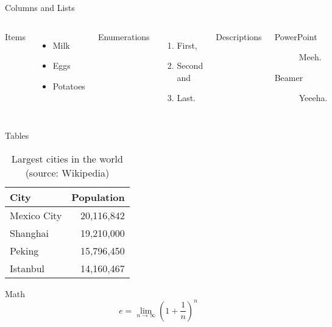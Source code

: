 \begin{frame}{Columns and Lists}
  \begin{columns}[T,onlytextwidth]
      Items
      \begin{itemize}
        \item Milk \item Eggs \item Potatoes
      \end{itemize}

      Enumerations
      \begin{enumerate}
        \item First, \item Second and \item Last.
      \end{enumerate}

      Descriptions
      \begin{description}
        \item[PowerPoint] Meeh. \item[Beamer] Yeeeha.
      \end{description}
  \end{columns}
\end{frame}

\begin{frame}{Tables}
  \begin{table}
    \caption{Largest cities in the world (source: Wikipedia)}
    \begin{tabular}{@{} lr @{}}
      \toprule
      City & Population\\
      \midrule
      Mexico City & 20,116,842\\
      Shanghai & 19,210,000\\
      Peking & 15,796,450\\
      Istanbul & 14,160,467\\
      \bottomrule
    \end{tabular}
  \end{table}
\end{frame}


\begin{frame}{Math}
  \begin{equation*}
    e = \lim_{n\to \infty} \left(1 + \frac{1}{n} \right)^n
  \end{equation*}
\end{frame}

